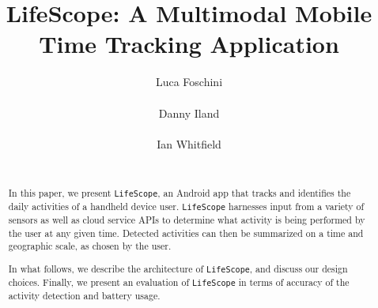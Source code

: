 \documentclass{acm_proc_article-sp}
\begin{document}
\title{LifeScope: A Multimodal Mobile Time Tracking Application}

\author{
\alignauthor
Luca Foschini\\
       \\
\alignauthor
Danny Iland\\
       \\
\alignauthor 
Ian Whitfield\\
       \\
}

\def\LS{{\tt LifeScope}\xspace}

\maketitle
\begin{abstract}
In this paper, we present \LS, an Android app that tracks and identifies the daily activities of a handheld device user.
\LS harnesses input from a variety of sensors as well as cloud service APIs to determine what activity is being performed by the user at any given time. Detected activities can then be summarized on a time and geographic scale, as chosen by the user.

In what follows, we describe the architecture of \LS, and discuss our design choices. Finally, we present an evaluation of \LS in terms of accuracy of the activity detection and battery usage.
\end{abstract}

\end{document}
